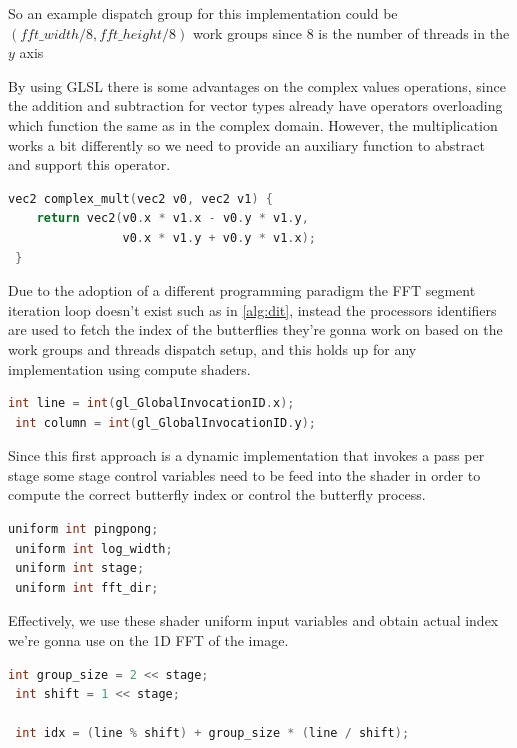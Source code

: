 \documentclass[
  oneside,
  11pt, a4paper,
  footinclude=true,
  headinclude=true,
  cleardoublepage=empty
]{scrbook}
\begin{document}
So an example dispatch group for this implementation could be $(fft\_width/8,fft\_height/8)$ work groups since 8 is the number of threads in the $y$ axis

By using GLSL there is some advantages on the complex values operations, since the addition and subtraction for vector types already have operators overloading which function the same as in the complex domain. However, the multiplication works a bit differently so we need to provide an auxiliary function to abstract and support this operator.

\begin{lstlisting}[language=C, caption={Complex multiplication}]
 vec2 complex_mult(vec2 v0, vec2 v1) {
 	return vec2(v0.x * v1.x - v0.y * v1.y,
 				v0.x * v1.y + v0.y * v1.x);
 }
\end{lstlisting}

Due to the adoption of a different programming paradigm the FFT segment iteration loop doesn't exist such as in \autoref{alg:dit}, instead the processors identifiers are used to fetch the index of the butterflies they're gonna work on based on the work groups and threads dispatch setup, and this holds up for any implementation using compute shaders.

\begin{lstlisting}[language=C, caption={Invocation indices}]
 int line = int(gl_GlobalInvocationID.x);
 int column = int(gl_GlobalInvocationID.y);
\end{lstlisting}

Since this first approach is a dynamic implementation that invokes a pass per stage some stage control variables need to be feed into the shader in order to compute the correct butterfly index or control the butterfly process.

\begin{lstlisting}[language=C, caption={Uniform control variables}]
 uniform int pingpong;
 uniform int log_width;
 uniform int stage;
 uniform int fft_dir;
\end{lstlisting}

Effectively, we use these shader uniform input variables and obtain actual index we're gonna use on the 1D FFT of the image.

\begin{lstlisting}[language=C, caption={FFT element index}]
 int group_size = 2 << stage;
 int shift = 1 << stage;
 
 int idx = (line % shift) + group_size * (line / shift);
\end{lstlisting}
\end{document}
